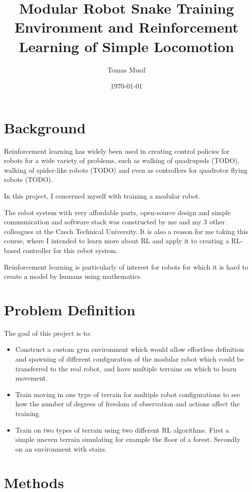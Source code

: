 \documentclass{article}
\author{Tomas Musil}
\date{\today}
\title{Modular Robot Snake Training Environment and Reinforcement Learning of Simple Locomotion}
\begin{document}
\maketitle

\section{Background}
Reinforcement learning has widely been used in creating control policies for robots for a wide variety of problems, such as walking of quadrupeds (TODO), walking of spider-like robots (TODO) and even as controllers for quadrotor flying robots (TODO).

In this project, I concerned myself with training a modular robot.

The robot system with very affordable parts, open-source design and simple communication and software stack was constructed by me and my 3 other colleagues at the Czech Technical University.
It is also a reason for me taking this course, where I intended to learn more about RL and apply it to creating a RL-based controller for this robot system.

Reinforcement learning is particularly of interest for robots for which it is hard to create a model by humans using mathematics. 


\section{Problem Definition}
The goal of this project is to:
\begin{itemize}
    \item Construct a custom gym environment which would allow effortless definition and spawning of different configuration of the modular robot which could be transferred to the real robot, and have multiple terrains on which to learn movement.
    \item Train moving in one type of terrain for multiple robot configurations to see how the number of degrees of freedom of observation and actions affect the training.
    \item Train on two types of terrain using two different RL algorithms. First a simple uneven terrain simulating for example the floor of a forest.
      Secondly on an environment with stairs.
\end{itemize}

\section{Methods}
\end{document}
